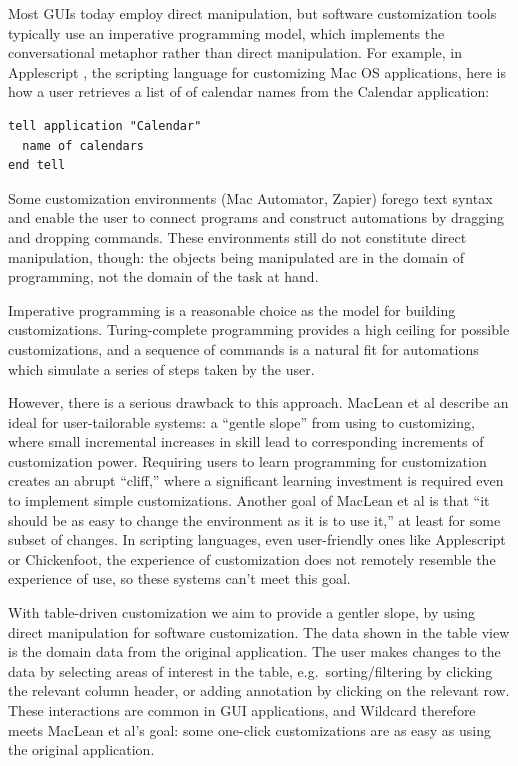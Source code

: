 \documentclass[sigplan,10pt,anonymous,review]{acmart}
\begin{document}
Most GUIs today employ direct manipulation, but software customization
tools typically use an imperative programming model, which implements
the conversational metaphor rather than direct manipulation. For
example, in Applescript \citep{cook2007}, the scripting language for
customizing Mac OS applications, here is how a user retrieves a list of
of calendar names from the Calendar application:

\begin{verbatim}
tell application "Calendar"
  name of calendars
end tell
\end{verbatim}

Some customization environments (Mac Automator, Zapier) forego text
syntax and enable the user to connect programs and construct automations
by dragging and dropping commands. These environments still do not
constitute direct manipulation, though: the objects being manipulated
are in the domain of programming, not the domain of the task at hand.

Imperative programming is a reasonable choice as the model for building
customizations. Turing-complete programming provides a high ceiling for
possible customizations, and a sequence of commands is a natural fit for
automations which simulate a series of steps taken by the user.

However, there is a serious drawback to this approach. MacLean et al
\citep{maclean1990} describe an ideal for user-tailorable systems: a
``gentle slope'' from using to customizing, where small incremental
increases in skill lead to corresponding increments of customization
power. Requiring users to learn programming for customization creates an
abrupt ``cliff,'' where a significant learning investment is required
even to implement simple customizations. Another goal of MacLean et al
is that ``it should be as easy to change the environment as it is to use
it,'' at least for some subset of changes. In scripting languages, even
user-friendly ones like Applescript or Chickenfoot, the experience of
customization does not remotely resemble the experience of use, so these
systems can't meet this goal.

With table-driven customization we aim to provide a gentler slope, by
using direct manipulation for software customization. The data shown in
the table view is the domain data from the original application. The
user makes changes to the data by selecting areas of interest in the
table, e.g.~sorting/filtering by clicking the relevant column header, or
adding annotation by clicking on the relevant row. These interactions
are common in GUI applications, and Wildcard therefore meets MacLean et
al's goal: some one-click customizations are as easy as using the
original application.
\end{document}
